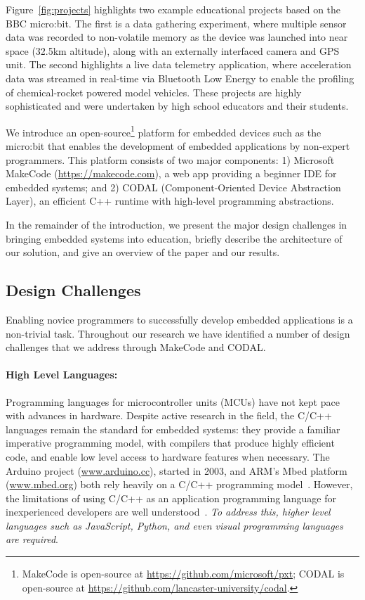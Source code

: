 Figure~\ref{fig:projects} highlights two example educational projects based on the BBC micro:bit. The first is a data gathering experiment, where multiple sensor data was recorded to non-volatile memory as the device was launched into near space (32.5km altitude), along with an externally interfaced camera and GPS unit. The second highlights a live data telemetry application, where acceleration data was streamed in real-time via Bluetooth Low Energy to enable the profiling of chemical-rocket powered model vehicles. These projects are highly sophisticated and were undertaken by high school educators and their students.

We introduce an open-source\footnote{
MakeCode is open-source at \url{https://github.com/microsoft/pxt}; CODAL is open-source at
\url{https://github.com/lancaster-university/codal}.} platform for embedded devices such as the micro:bit that enables the development of embedded applications by non-expert programmers. This platform consists of two major components: 1) Microsoft MakeCode (\url{https://makecode.com}), a web app providing a beginner IDE for embedded
systems; and 2) CODAL (Component-Oriented Device Abstraction Layer), an efficient C++ runtime with high-level programming abstractions.

In the remainder of the introduction, we present the major design challenges in
bringing embedded systems into education, briefly describe the
architecture of our solution, and give an overview of the
paper and our results.

\subsection{Design Challenges}
\label{sec:DesignChallenges}
Enabling novice programmers to successfully develop embedded applications is a non-trivial task. Throughout our research we have identified a number of design challenges that we address through MakeCode and CODAL.

\paragraph{High Level Languages:}
Programming languages for microcontroller units (MCUs) have not kept pace with advances in hardware. Despite active research in the field, the C/C++ languages remain the standard for embedded systems: they provide a familiar imperative programming model, with compilers that produce highly efficient code, and enable low level access to hardware features when necessary. The Arduino project (\url{www.arduino.cc}), started in 2003, and ARM's Mbed platform (\url{www.mbed.org}) both rely heavily on a C/C++ programming model~\cite{buildingArduino2014,ARMmbed}. However, the limitations of using C/C++ as an application programming language for inexperienced developers are well understood~\cite{blikstein2013gears}. \emph{To address this, higher level languages such as JavaScript, Python, and even visual programming languages are required}.

